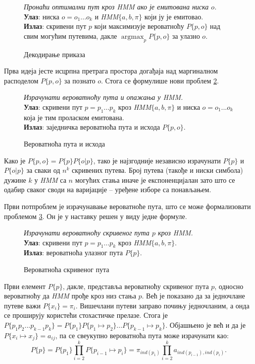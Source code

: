 \documentclass[12pt,oneside]{memoir}
\newenvironment{problem}[1][!ht]
{\renewcommand{\algorithmcfname}{Проблем}
\begin{figure}[!ht]
\centering
  \begin{minipage}{.94\linewidth}
	\begin{algorithm}[#1]%
  }{\end{algorithm}
  \end{minipage}
\end{figure}}
\begin{document}
\begin{CJK}{UTF8}{ipxm}
\begin{problem}[H]
  \SetAlgoLined
  \textit{Пронаћи оптимални пут кроз \textit{HMM} ако је емитована ниска $o$.}\\
  \textbf{Улаз}: ниска $o = o_1...o_k$ и \textit{HMM}$\{a, b, \pi\}$ који ју је емитовао.\\
  \textbf{Излаз}: скривени пут $p$ који максимизује вероватноћу $P\{p, o\}$ над свим могућим путевима, дакле $\operatorname*{argmax}_p P\{p, o\}$ за улазно $o$.
  \caption{Декодирање приказа}
  \label{prob:dekod}
\end{problem}

Прва идеја јесте исцрпна претрага простора догађаја над маргиналном расподелом $P\{p, o\}$ за познато $o$. Стога се формулише нови проблем \ref{prob:putishod}.

\begin{problem}[H]
  \SetAlgoLined
  \textit{Израчунати вероватноћу пута и опажања у \textit{HMM}.}\\
  \textbf{Улаз}: скривени пут $p = p_1...p_k$ кроз \textit{HMM}$\{a, b, \pi\}$ и ниска $o = o_1...o_k$ која је тим проласком емитована.\\
  \textbf{Излаз}: заједничка вероватноћа пута и исхода $P\{p, o\}$.
  \caption{Вероватноћа пута и исхода}
  \label{prob:putishod}
\end{problem}

Како је $P\{p, o\} = P\{p\} P\{o | p\}$, тако је најзгодније независно израчунати $P\{p\}$ и $P\{o | p\}$ за сваки од $n^k$ скривених путева. Број путева (такође и ниски симбола) дужине $k$ у \textit{HMM} са $n$ могућих стања иначе је експоненцијалан зато што се одабир сваког своди на варијације -- уређене изборе са понављањем.

Први потпроблем је израчунавање вероватноће пута, што се може формализовати проблемом \ref{prob:put}. Он је у наставку решен у виду једне формуле.

\begin{problem}[H]
  \SetAlgoLined
  \textit{Израчунати вероватноћу скривеног пута $p$ кроз \textit{HMM}.}\\
  \textbf{Улаз}: скривени пут $p = p_1...p_k$ кроз \textit{HMM}$\{a, b, \pi\}$.\\
  \textbf{Излаз}: вероватноћа улазног пута $P\{p\}$.
  \caption{Вероватноћа скривеног пута\cite{ba10a}}
  \label{prob:put}
\end{problem}

Први елемент $P\{p\}$, дакле, представља вероватноћу скривеног пута $p$, односно вероватноћу да \textit{HMM} прође кроз низ стања $p$. Већ је показано да за једночлане путеве важи $P\{x_i\} = \pi_i$. Вишечлани путеви заправо почињу једночланим, а онда се проширују користећи стохастичке прелазе. Стога је $P\{p_1p_2...p_{k-1}p_k\} = P\{p_1\}P\{p_1 \mapsto p_2\}...P\{p_{k-1} \mapsto p_k\}$. Објашњено је већ и да је $P\{x_i \mapsto x_j\} = a_{ij}$, па се свеукупно вероватноћа пута може израчунати као: $$P\{p\} = P\{p_1\} \prod_{i=2}^k P\{p_{i-1} \mapsto p_i\} = \pi_{ind(p_1)} \prod_{i=2}^k a_{ind(p_{i-1}), ind(p_i)}.$$


\end{CJK}
\end{document}
